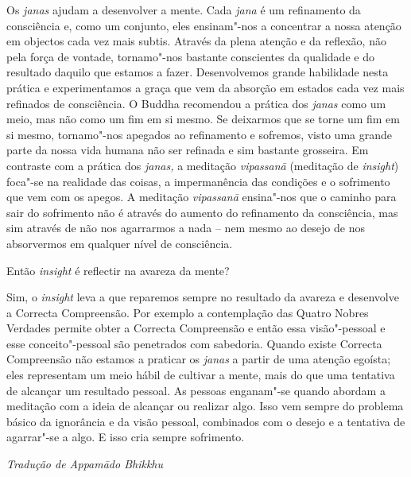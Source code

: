  Os \emph{janas} ajudam a desenvolver a mente. Cada \emph{jana}
é um refinamento da consciência e, como um conjunto, eles ensinam"-nos a
concentrar a nossa atenção em objectos cada vez mais subtis. Através da
plena atenção e da reflexão, não pela força de vontade, tornamo"-nos
bastante conscientes da qualidade e do resultado daquilo que estamos a
fazer. Desenvolvemos grande habilidade nesta prática e experimentamos a
graça que vem da absorção em estados cada vez mais refinados de
consciência. O Buddha recomendou a prática dos \emph{janas} como um
meio, mas não como um fim em si mesmo. Se deixarmos que se torne um fim
em si mesmo, tornamo"-nos apegados ao refinamento e sofremos, visto uma
grande parte da nossa vida humana não ser refinada e sim bastante
grosseira. Em contraste com a prática dos \emph{janas,} a meditação
\emph{vipassanā} (meditação de \emph{insight}) foca"-se na realidade das
coisas, a impermanência das condições e o sofrimento que vem com os
apegos. A meditação \emph{vipassanā} ensina"-nos que o caminho para sair
do sofrimento não é através do aumento do refinamento da consciência,
mas sim através de não nos agarrarmos a nada -- nem mesmo ao desejo de
nos absorvermos em qualquer nível de consciência.

\bigskip

 Então \emph{insight} é reflectir na avareza da mente?

 Sim, o \emph{insight} leva a que reparemos sempre no resultado
da avareza e desenvolve a Correcta Compreensão. Por exemplo a
contemplação das Quatro Nobres Verdades permite obter a Correcta
Compreensão e então essa visão"-pessoal e esse conceito"-pessoal são
penetrados com sabedoria. Quando existe Correcta Compreensão não estamos
a praticar os \emph{janas} a partir de uma atenção egoísta; eles
representam um meio hábil de cultivar a mente, mais do que uma tentativa
de alcançar um resultado pessoal. As pessoas enganam"-se quando abordam a
meditação com a ideia de alcançar ou realizar algo. Isso vem sempre do
problema básico da ignorância e da visão pessoal, combinados com o
desejo e a tentativa de agarrar"-se a algo. E isso cria sempre
sofrimento.

\bigskip

{\raggedleft\itshape
  Tradução de Appamādo Bhikkhu
\par}